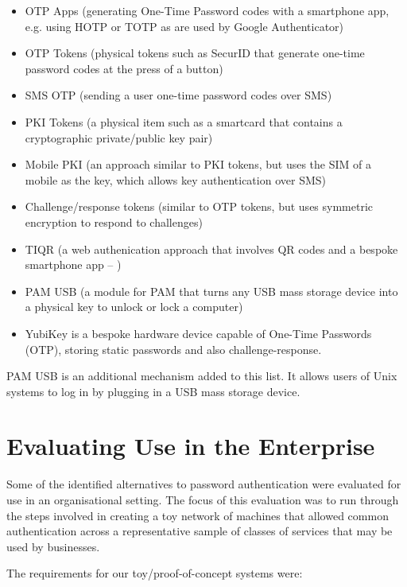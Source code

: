 \documentclass{report}
\begin{document}
\begin{itemize}
  \item OTP Apps (generating One-Time Password codes with a smartphone app, e.g.
    using HOTP or TOTP as are used by Google Authenticator)
  \item OTP Tokens (physical tokens such as SecurID that generate one-time
    password codes at the press of a button)
  \item SMS OTP (sending a user one-time password codes over SMS)
  \item PKI Tokens (a physical item such as a smartcard that contains
    a cryptographic private/public key pair)
  \item Mobile PKI (an approach similar to PKI tokens, but uses the SIM of a
    mobile as the key, which allows key authentication over SMS)
  \item Challenge/response tokens (similar to OTP tokens, but uses symmetric
    encryption to respond to challenges)
  \item TIQR (a web authenication approach that involves QR codes and a
    bespoke smartphone app -- \textcite{van2011tiqr})
  \item PAM USB (a module for PAM that turns any USB mass storage device
    into a physical key to unlock or lock a computer)
  \item YubiKey is a bespoke hardware device capable of One-Time Passwords (OTP),
    storing static passwords and also challenge-response.
\end{itemize}

PAM USB \parencite{steele2005paranoid} is an additional mechanism added to
this list. It allows users of Unix systems to log in by plugging in a USB
mass storage device.

\section{Evaluating Use in the Enterprise}
\label{sec:evaluation}

Some of the identified alternatives to password authentication were
evaluated for use in an organisational setting. The focus of this evaluation
was to run through the steps involved in creating a toy network of machines
that allowed common authentication across a representative sample of
classes of services that may be used by businesses.

The requirements for our toy/proof-of-concept systems were:
\end{document}
